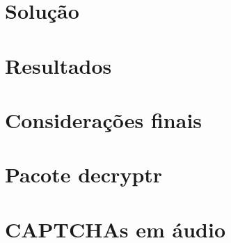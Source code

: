 \documentclass[12pt,]{report}
\begin{document}
\chapter{Solução}\label{solucao}

\chapter{Resultados}\label{resultados}

\chapter{Considerações finais}\label{consideracoes-finais}

\chapter{Pacote decryptr}\label{pacote-decryptr}

\chapter{CAPTCHAs em áudio}\label{captchas-em-audio}


\end{document}
